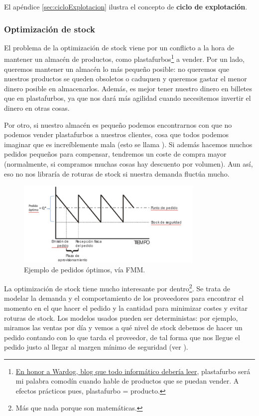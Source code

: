 \documentclass[nochap,palatino,shortheader]{apuntes}
\begin{document}
El apéndice \ref{sec:cicloExplotacion} ilustra el concepto de \textbf{ciclo de explotación}.

\subsubsection{Optimización de stock}

El problema de la optimización de stock viene por un conflicto a la hora de mantener un almacén de productos, como plastafurbos\footnote{\href{http://mundowdg.com/blog/2009/04/16/adioshola/}{En honor a Wardog, blog que todo informático debería leer}, plastafurbo será mi palabra comodín cuando hable de productos que se puedan vender. A efectos prácticos pues, plastafurbo = producto.} a vender. Por un lado, queremos mantener un almacén lo más pequeño posible: no queremos que nuestros productos se queden obsoletos o caduquen y queremos gastar el menor dinero posible en almacenarlos. Además, es mejor tener nuestro dinero en billetes que en plastafurbos, ya que nos dará más agilidad cuando necesitemos invertir el dinero en otras cosas.

Por otro, si nuestro almacén es pequeño podemos encontrarnos con que no podemos vender plastafurbos a nuestros clientes, cosa que todos podemos imaginar que es increíblemente mala (esto se llama ). Si además hacemos muchos pedidos pequeños para compensar, tendremos un coste de compra mayor (normalmente, si compramos muchas cosas hay descuento por volumen). Aun así, eso no nos libraría de roturas de stock si nuestra demanda fluctúa mucho.

\begin{figure}[hbtp]
\centering
\includegraphics[width=0.8\textwidth]{img/ControlStock.png}
\caption{Ejemplo de pedidos óptimos, vía FMM.}
\label{fig:StockDeterminista}
\end{figure}

La optimización de stock tiene mucho interesante por dentro\footnote{Más que nada porque son matemáticas.}. Se trata de modelar la demanda y el comportamiento de los proveedores para encontrar el momento en el que hacer el pedido y la cantidad para minimizar costes y evitar roturas de stock. Los modelos usados pueden ser deterministas: por ejemplo, miramos las ventas por día y vemos a qué nivel de stock debemos de hacer un pedido contando con lo que tarda el proveedor, de tal forma que nos llegue el pedido justo al llegar al margen mínimo de seguridad (ver ).
\end{document}

